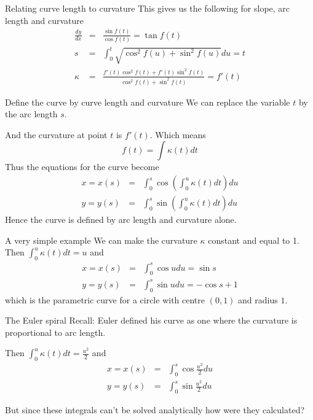 \documentclass{beamer}
\begin{document}
\begin{frame}{Relating curve length to curvature}
	This gives us the following for slope, arc length and curvature
	\begin{eqnarray*}
	\frac{dy}{dx} &=& \frac{\sin f(t)}{\cos f(t)} = \tan f(t) \\
 	s &=& \int_0^t \sqrt{\cos^2 f(u) + \sin^2 f(u)} du = t \\
 	\kappa &=& \frac{f'(t) \cos^2 f(t) + f'(t) \sin^2 f(t)}{\cos^2 f(t) + \sin^2 f(t)} = f'(t)
 \end{eqnarray*}
\end{frame}

\begin{frame}{Define the curve by curve length and curvature}
	We can replace the variable $t$ by the arc length $s$.
	 
	And the curvature at point $t$ is $f'(t)$. Which means
	 \[
	 f(t) = \int \kappa(t) dt
	 \]
	Thus the equations for the curve become
	\begin{eqnarray*}
	x = x(s) &=& \int_{0}^{s} \cos \left( \int_0^u \kappa(t) dt \right) du \\
	y = y(s) &=& \int_{0}^{s} \sin \left( \int_0^u \kappa(t) dt \right) du
	\end{eqnarray*}
	Hence the curve is defined by arc length and curvature alone.
\end{frame}

\begin{frame}{A very simple example}
	We can make the curvature $\kappa$ constant and equal to 1. Then 
	$ \int_0^u \kappa(t) dt = u $ and
	\begin{eqnarray*}
		x = x(s) &=& \int_{0}^{s} \cos u du = \sin s\\
		y = y(s) &=& \int_{0}^{s} \sin u du = - \cos s + 1
	\end{eqnarray*}
	which is the parametric curve for a circle with centre $(0, 1)$ and radius $1$.
	
\end{frame}


\begin{frame}{The Euler spiral}
	Recall: Euler defined his curve as one where the curvature is proportional to arc length.
	
	\begin{center}
	\end{center}
	Then 
	$ \int_0^u \kappa(t) dt = \frac{u^2}{2} $ and
	\begin{eqnarray*}
		x = x(s) &=& \int_{0}^{s} \cos \frac{u^2}{2} du\\
		y = y(s) &=& \int_{0}^{s} \sin \frac{u^2}{2} du
	\end{eqnarray*}

	But since these integrals can't be solved analytically how were they calculated?
\end{frame}
\end{document}
